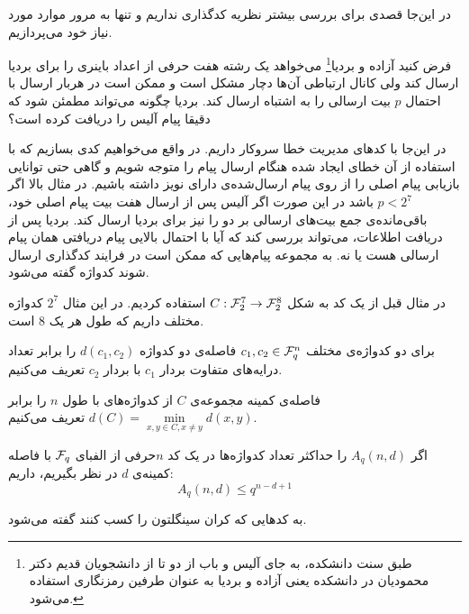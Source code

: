 در این‌جا قصدی برای بررسی بیشتر نظریه کدگذاری نداریم و تنها به مرور موارد مورد نیاز خود می‌پردازیم.
\begin{example}
	فرض کنید آزاده و بردیا\footnote{طبق سنت دانشکده، به جای آلیس و باب از دو تا از دانشجویان قدیم دکتر محمودیان در دانشکده یعنی آزاده و بردیا به عنوان طرفین رمزنگاری استفاده می‌شود.}
	 می‌خواهد یک رشته هفت حرفی از اعداد باینری را برای بردیا ارسال کند ولی کانال ارتباطی آن‌ها دچار مشکل است و ممکن است در هربار ارسال با احتمال
	$p$
	بیت ارسالی را به اشتباه ارسال کند. بردیا چگونه می‌تواند مطمئن شود که دقیقا پیام آلیس را دریافت کرده است؟
	
	در این‌جا با کدهای مدیریت خطا سروکار داریم. در واقع می‌خواهیم کدی بسازیم که با استفاده از آن خطای ایجاد شده هنگام ارسال پیام را متوجه شویم و گاهی حتی توانایی بازیابی پیام اصلی را از روی پیام ارسال‌شده‌ی دارای نویز داشته باشیم. در مثال بالا اگر
	$p < 2^7$
	باشد در این صورت اگر آلیس پس از ارسال هفت بیت پیام اصلی خود، باقی‌مانده‌ی جمع بیت‌های ارسالی بر دو را نیز برای بردیا ارسال کند. بردیا پس از دریافت اطلاعات، می‌تواند بررسی کند که آیا با احتمال بالایی پیام دریافتی همان پیام ارسالی هست یا نه. به مجموعه‌ پیام‌هایی که ممکن است در فرایند کدگذاری ارسال شوند کدواژه گفته می‌شود.
	
	در مثال قبل از یک کد به شکل
	$C: \mathcal{F}_2^7 \rightarrow \mathcal{F}_2^8$
	استفاده کردیم. در این مثال
	$2^7$
	کدواژه مختلف داریم که طول هر یک
	$8$
	است.
\end{example}

\begin{definition}
	برای دو کدواژه‌ی مختلف
	$c_1, c_2 \in \mathcal{F}_q^n$
	فاصله‌ی دو کدواژه
	$d(c_1, c_2)$
	را برابر تعداد درایه‌های متفاوت بردار
	$c_1$
	با بردار
	$c_2$
	تعریف می‌کنیم.
	
	 فاصله‌‌ی کمینه مجموعه‌ی
	$C$
	از کدواژه‌های با طول
	$n$
	 را برابر
	$d(C) = \min\limits_{x, y \in C, x \ne y} d(x, y)$
	تعریف می‌کنیم.
\end{definition}

\begin{definition}
	اگر
	$A_q(n, d)$
	را حداکثر تعداد کدواژه‌ها در یک کد
	$n$حرفی
 از الفبای
	$\mathcal{F}_q$
	با فاصله کمینه‌ی 
	$d$
	در نظر بگیریم، داریم:
	\begin{equation}
		A_q(n, d) \leq q^{n - d + 1}
	\end{equation}
\end{definition}
\begin{definition}
	\label{def:mds}
	به کدهایی که کران سینگلتون را کسب کنند گفته می‌شود.
\end{definition}

